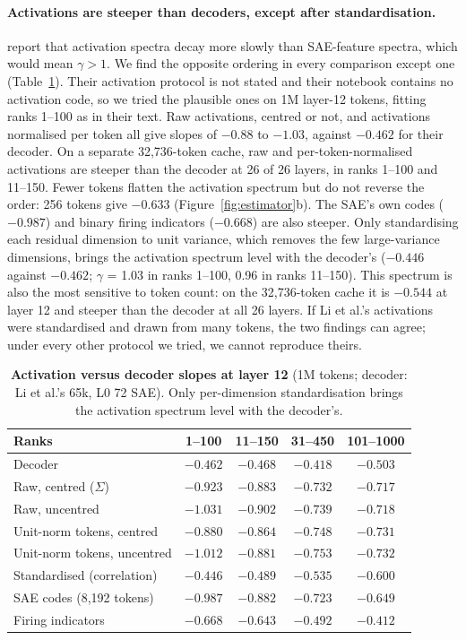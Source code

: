 \documentclass[10pt,twocolumn]{article}
\newcommand{\gam}{\gamma}
\begin{document}
\paragraph{Activations are steeper than decoders, except after standardisation.} \citet{li2025geometry} report that activation spectra decay more slowly than SAE-feature spectra, which would mean $\gam > 1$. We find the opposite ordering in every comparison except one (Table~\ref{tab:li}). Their activation protocol is not stated and their notebook contains no activation code, so we tried the plausible ones on 1M layer-12 tokens, fitting ranks 1--100 as in their text. Raw activations, centred or not, and activations normalised per token all give slopes of $-0.88$ to $-1.03$, against $-0.462$ for their decoder. On a separate 32,736-token cache, raw and per-token-normalised activations are steeper than the decoder at 26 of 26 layers, in ranks 1--100 and 11--150. Fewer tokens flatten the activation spectrum but do not reverse the order: 256 tokens give $-0.633$ (Figure~\ref{fig:estimator}b). The SAE's own codes ($-0.987$) and binary firing indicators ($-0.668$) are also steeper. Only standardising each residual dimension to unit variance, which removes the few large-variance dimensions, brings the activation spectrum level with the decoder's ($-0.446$ against $-0.462$; $\gam$ = 1.03 in ranks 1--100, 0.96 in ranks 11--150). This spectrum is also the most sensitive to token count: on the 32,736-token cache it is $-0.544$ at layer 12 and steeper than the decoder at all 26 layers. If Li et al.'s activations were standardised and drawn from many tokens, the two findings can agree; under every other protocol we tried, we cannot reproduce theirs.

\begin{table}[t]
\centering
\footnotesize\setlength{\tabcolsep}{2.5pt}
\caption{\textbf{Activation versus decoder slopes at layer 12} (1M tokens; decoder: Li et al.'s 65k, L0 72 SAE). Only per-dimension standardisation brings the activation spectrum level with the decoder's.}
\label{tab:li}
\begin{tabular}{lcccc}
\toprule
Ranks & 1--100 & 11--150 & 31--450 & 101--1000 \\
\midrule
Decoder & $-0.462$ & $-0.468$ & $-0.418$ & $-0.503$ \\
\midrule
Raw, centred ($\Sigma$) & $-0.923$ & $-0.883$ & $-0.732$ & $-0.717$ \\
Raw, uncentred & $-1.031$ & $-0.902$ & $-0.739$ & $-0.718$ \\
Unit-norm tokens, centred & $-0.880$ & $-0.864$ & $-0.748$ & $-0.731$ \\
Unit-norm tokens, uncentred & $-1.012$ & $-0.881$ & $-0.753$ & $-0.732$ \\
Standardised (correlation) & $-0.446$ & $-0.489$ & $-0.535$ & $-0.600$ \\
\midrule
SAE codes (8,192 tokens) & $-0.987$ & $-0.882$ & $-0.723$ & $-0.649$ \\
Firing indicators & $-0.668$ & $-0.643$ & $-0.492$ & $-0.412$ \\
\bottomrule
\end{tabular}
\end{table}
\end{document}
